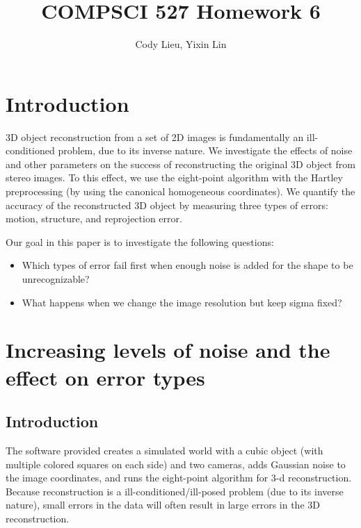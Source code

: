 \documentclass{article}
\author{Cody Lieu, Yixin Lin}
\title{COMPSCI 527 Homework 6}
\begin{document}
\maketitle

% 


\section{Introduction}

3D object reconstruction from a set of 2D images is fundamentally an ill-conditioned problem, due to its inverse nature. We investigate the effects of noise and other parameters on the success of reconstructing the original 3D object from stereo images. To this effect, we use the eight-point algorithm with the Hartley preprocessing\cite{hartley} (by using the canonical homogeneous coordinates). We quantify the accuracy of the reconstructed 3D object by measuring three types of errors: motion, structure, and reprojection error.

Our goal in this paper is to investigate the following questions:
\begin{itemize}
\item Which types of error fail first when enough noise is added for the shape to be unrecognizable? 
\item What happens when we change the image resolution but keep sigma fixed?
\end{itemize}

\section{Increasing levels of noise and the effect on error types}

\subsection{Introduction}

The software provided creates a simulated world with a cubic object (with multiple colored squares on each side) and two cameras, adds Gaussian noise to the image coordinates, and runs the eight-point algorithm for 3-d reconstruction. Because reconstruction is a ill-conditioned/ill-posed problem (due to its inverse nature), small errors in the data will often result in large errors in the 3D reconstruction. 
\end{document}
